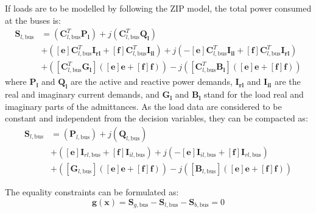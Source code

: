 \documentclass{article}
\begin{document}
If loads are to be modelled by following the ZIP model, the total power consumed at the buses is:
\begin{equation}
    \begin{split}
    \bm{S}_{l,\text{bus}} & = (\bm{C}_{l,\text{bus}}^T\bm{P_l}) + j (\bm{C}_{l,\text{bus}}^T\bm{Q_l}) \\
                          & + ([\bm{e}]\bm{C}_{l,\text{bus}}^T \bm{I_{rl}} + [\bm{f}]\bm{C}_{l,\text{bus}}^T \bm{I_{il}}) + j(-[\bm{e}]\bm{C}_{l,\text{bus}}^T \bm{I_{il}} + [\bm{f}]\bm{C}_{l,\text{bus}}^T \bm{I_{rl}}) \\
                          & + ([\bm{C}_{l,\text{bus}}^T \bm{G_l}]([\bm{e}]\bm{e} + [\bm{f}]\bm{f})) -j([\bm{C}_{l,\text{bus}}^T \bm{B_l}]([\bm{e}]\bm{e} + [\bm{f}]\bm{f}))
    \end{split}
\end{equation}
where $\bm{P_l}$ and $\bm{Q_l}$ are the active and reactive power demands, $\bm{I_{rl}}$ and $\bm{I_{il}}$ are the real and imaginary current demands, and $\bm{G_l}$ and $\bm{B_l}$ stand for the load real and imaginary parts of the admittances. As the load data are considered to be constant and independent from the decision variables, they can be compacted as:
\begin{equation}
    \begin{split}
    \bm{S}_{l,\text{bus}} & = (\bm{P}_{l,\text{bus}}) + j (\bm{Q}_{l,\text{bus}}) \\
                          & + ([\bm{e}]\bm{I}_{rl,\text{bus}} + [\bm{f}]\bm{I}_{il,\text{bus}}) + j(-[\bm{e}]\bm{I}_{il,\text{bus}} + [\bm{f}]\bm{I}_{rl,\text{bus}}) \\
                          & + ([\bm{G}_{l,\text{bus}}]([\bm{e}]\bm{e} + [\bm{f}]\bm{f})) -j([\bm{B}_{l,\text{bus}}]([\bm{e}]\bm{e} + [\bm{f}]\bm{f}))
    \end{split}
\end{equation}

The equality constraints can be formulated as:
\begin{equation}
    \bm{g(x)} = \bm{S}_{g,\text{bus}} - \bm{S}_{l,\text{bus}} - \bm{S}_{b,\text{bus}} = 0
\end{equation}
\end{document}
